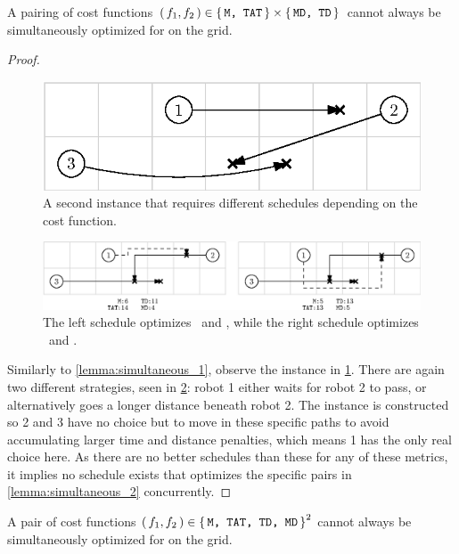 \begin{lemma}\label{lemma:simultaneous_2}
	A pairing of cost functions \((\, f_1, f_2 \,) \in \set{\texttt{M, TAT}} \times \set{\texttt{MD, TD}}\) cannot always be simultaneously optimized for on the grid. 
\end{lemma}

\begin{proof}
	\begin{figure}[h]
		\centering
		\includegraphics[width=0.45\linewidth]{ipe/sim2_problem.eps}
		\caption{
			A second instance that requires different schedules depending on the cost function.
		}
		\label{fig:sim2}
	\end{figure}

	\begin{figure}[h]
		\centering
		\includegraphics[width=\linewidth]{ipe/sim2_strat.eps}
		\caption{
			The left schedule optimizes \ and , while the right schedule optimizes \ and .
		}
		\label{fig:sim2_strat}
	\end{figure}

	Similarly to \cref{lemma:simultaneous_1}, observe the instance in \cref{fig:sim2}. 
	There are again two different strategies, seen in \cref{fig:sim2_strat}: robot 1 either waits for robot 2 to pass, or alternatively goes a longer distance beneath robot 2. 
	The instance is constructed so 2 and 3 have no choice but to move in these specific paths to avoid accumulating larger time and distance penalties, which means 1 has the only real choice here. 
	As there are no better schedules than these for any of these metrics, it implies no schedule exists that optimizes the specific pairs in \cref{lemma:simultaneous_2} concurrently.
\end{proof}

\begin{theorem}
	A pair of cost functions \((\, f_1, f_2 \,) \in \set{\texttt{M, TAT, TD, MD}}^2 \) cannot always be simultaneously optimized for on the grid. 
\end{theorem}

